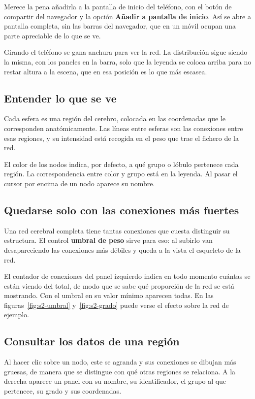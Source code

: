 Merece la pena añadirla a la pantalla de inicio del teléfono, con el botón de compartir del
navegador y la opción \textbf{Añadir a pantalla de inicio}. Así se abre a pantalla completa, sin las
barras del navegador, que en un móvil ocupan una parte apreciable de lo que se ve.

Girando el teléfono se gana anchura para ver la red. La distribución sigue siendo la misma, con los
paneles en la barra, solo que la leyenda se coloca arriba para no restar altura a la escena, que en
esa posición es lo que más escasea.

\subsection{Entender lo que se ve}

Cada esfera es una región del cerebro, colocada en las coordenadas que le corresponden
anatómicamente. Las líneas entre esferas son las conexiones entre esas regiones, y su intensidad
está recogida en el peso que trae el fichero de la red.

El color de los nodos indica, por defecto, a qué grupo o lóbulo pertenece cada región. La
correspondencia entre color y grupo está en la leyenda. Al pasar el cursor por encima de un nodo
aparece su nombre.

\subsection{Quedarse solo con las conexiones más fuertes}

Una red cerebral completa tiene tantas conexiones que cuesta distinguir su estructura. El control
\textbf{umbral de peso} sirve para eso: al subirlo van desapareciendo las conexiones más débiles y
queda a la vista el esqueleto de la red.

El contador de conexiones del panel izquierdo indica en todo momento cuántas se están viendo del
total, de modo que se sabe qué proporción de la red se está mostrando. Con el umbral en su valor
mínimo aparecen todas. En las figuras~\ref{fig:s2-umbral} y~\ref{fig:s2-grado} puede verse el efecto
sobre la red de ejemplo.

\subsection{Consultar los datos de una región}

Al hacer clic sobre un nodo, este se agranda y sus conexiones se dibujan más gruesas, de manera que
se distingue con qué otras regiones se relaciona. A la derecha aparece un panel con su nombre, su
identificador, el grupo al que pertenece, su grado y sus coordenadas.

